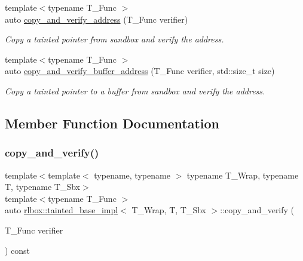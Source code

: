 \begin{DoxyCompactItemize}
$${\footnotesize template$<$typename T\+\_\+\+Func $>$ }\\auto \hyperlink{classrlbox_1_1tainted__base__impl_ad34419b3444d0bf37e25ecf7d37fbe0b}{copy\+\_\+and\+\_\+verify\+\_\+address} (T\+\_\+\+Func verifier)
\begin{DoxyCompactList}\small\item\em Copy a tainted pointer from sandbox and verify the address. \end{DoxyCompactList}\item 
{\footnotesize template$<$typename T\+\_\+\+Func $>$ }\\auto \hyperlink{classrlbox_1_1tainted__base__impl_a4f739a0994af23036cce2d06b10953ee}{copy\+\_\+and\+\_\+verify\+\_\+buffer\+\_\+address} (T\+\_\+\+Func verifier, std\+::size\+\_\+t size)
\begin{DoxyCompactList}\small\item\em Copy a tainted pointer to a buffer from sandbox and verify the address. \end{DoxyCompactList}\end{DoxyCompactItemize}


\subsection{Member Function Documentation}
\mbox{\label{classrlbox_1_1tainted__base__impl_a701759aedd637f48cc97a0e6ada1c8a6}} 
\subsubsection{\texorpdfstring{copy\+\_\+and\+\_\+verify()}{copy\_and\_verify()}}
{\footnotesize\ttfamily template$<$template$<$ typename, typename $>$ typename T\+\_\+\+Wrap, typename T, typename T\+\_\+\+Sbx$>$ \\
template$<$typename T\+\_\+\+Func $>$ \\
auto \hyperlink{classrlbox_1_1tainted__base__impl}{rlbox\+::tainted\+\_\+base\+\_\+impl}$<$ T\+\_\+\+Wrap, T, T\+\_\+\+Sbx $>$\+::copy\+\_\+and\+\_\+verify (\begin{DoxyParamCaption}\item[{T\+\_\+\+Func}]{verifier }\end{DoxyParamCaption}) const\hspace{0.3cm}{\ttfamily [inline]}}




